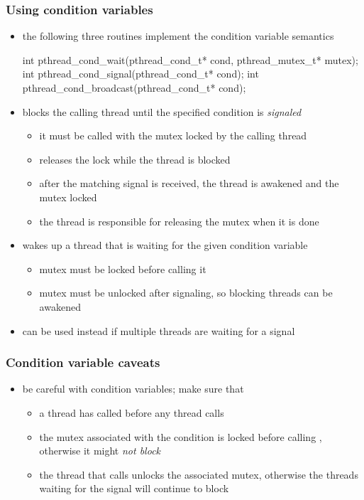 \begin{frame}[fragile]
%
  \frametitle{Using condition variables}
%
  \begin{itemize}
%
  \item the following three routines implement the condition variable semantics
%
    \begin{C}
int pthread_cond_wait(pthread_cond_t* cond, pthread_mutex_t* mutex);
int pthread_cond_signal(pthread_cond_t* cond);
int pthread_cond_broadcast(pthread_cond_t* cond);
    \end{C}
%
  \item {} blocks the calling thread until the specified
    condition is {\em signaled}
    \begin{itemize}
    \item it must be called with the mutex locked by the calling thread
    \item {} releases the lock while the thread is blocked
    \item after the matching signal is received, the thread is awakened and the mutex locked
    \item the thread is responsible for releasing the mutex when it is done
    \end{itemize}
%
  \item {} wakes up a thread that is waiting for the given
    condition variable
    \begin{itemize}
    \item mutex must be locked before calling it
    \item mutex must be unlocked after signaling, so blocking threads can be awakened
    \end{itemize}
%
  \item {} can be used instead if multiple threads are
    waiting for a signal
%
  \end{itemize}
%
\end{frame}

\begin{frame}[fragile]
%
  \frametitle{Condition variable caveats}
%
  \begin{itemize}
%
  \item be careful with condition variables; make sure that
    \begin{itemize}
    \item a thread has called  before any thread
      calls 
    \item the mutex associated with the condition is locked before calling
      , otherwise it might {\em not block}
    \item the thread that calls  unlocks the associated
      mutex, otherwise the threads waiting for the signal will continue to block
    \end{itemize}
%
%
  \end{itemize}
%
\end{frame}

